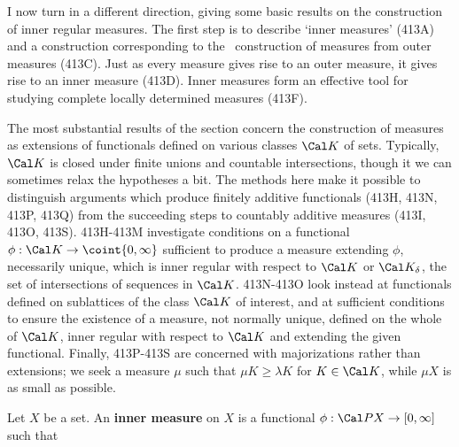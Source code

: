 
\def\chaptername{Topologies and measures I}
\def\sectionname{Inner measure constructions}


I now turn in a different direction, giving some basic results on
the construction of inner regular measures.   The first step is to
describe `inner measures' (413A) and a construction corresponding to the
\Caratheodory\ construction of measures from outer measures (413C).
Just as every measure gives rise to an outer measure, it gives rise to
an inner measure (413D).   Inner measures form an effective tool for
studying complete locally determined measures (413F).

The most substantial results of the section concern the construction of
measures as extensions of functionals defined on various classes
$\Cal K$ of sets.   Typically, $\Cal K$ is closed under finite unions
and countable
intersections, though it we can sometimes relax the hypotheses a bit.
The methods here make it possible to distinguish
arguments which produce finitely additive functionals (413H, 413N, 413P,
413Q) from
the succeeding steps to countably additive measures (413I, 413O, 413S).
413H-413M investigate conditions on a functional
$\phi:\Cal K\to\coint{0,\infty}$ sufficient to produce a measure
extending $\phi$, necessarily
unique, which is inner regular with respect to $\Cal K$ or
$\Cal K_{\delta}$, the
set of intersections of sequences in $\Cal K$.   413N-413O look instead
at functionals defined on sublattices of the class $\Cal K$ of interest,
and at sufficient conditions to ensure the existence of a measure, not
normally unique, defined on the whole of $\Cal K$, inner regular with
respect to
$\Cal K$ and extending the given functional.   Finally, 413P-413S are
concerned with majorizations rather than extensions;  we seek a measure
$\mu$ such that $\mu K\ge\lambda K$ for $K\in\Cal K$, while $\mu X$ is
as small as possible.

 Let $X$ be a set.   An {\bf inner measure} on
$X$ is a functional $\phi:\Cal PX\to[0,\infty]$ such that



